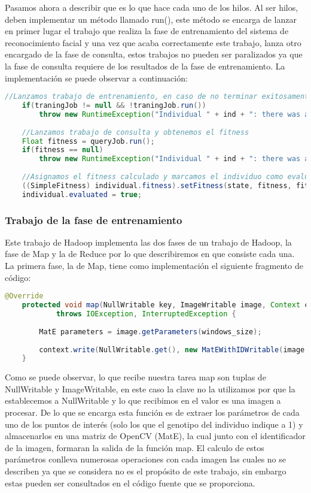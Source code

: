 Pasamos ahora a describir que es lo que hace cada uno de los hilos. Al ser hilos, deben implementar un m\'etodo llamado run(), este método se encarga de lanzar en primer lugar el trabajo que realiza la fase de entrenamiento del sistema de reconocimiento facial y una vez que acaba correctamente este trabajo, lanza otro encargado de la fase de consulta, estos trabajos no pueden ser paralizados ya que la fase de consulta requiere de los resultados de la fase de entrenamiento. La implementación se puede observar a continuación:

 \begin{lstlisting}[language=Java]
 	//Lanzamos trabajo de entrenamiento, en caso de no terminar exitosamente lanzamos una excepcion
	if(traningJob != null && !traningJob.run())
		throw new RuntimeException("Individual " + ind + ": there was a problem during the training phase");
		
	//Lanzamos trabajo de consulta y obtenemos el fitness
	Float fitness = queryJob.run();
	if(fitness == null)
		throw new RuntimeException("Individual " + ind + ": there was a problem during the query phase");
			
	//Asignamos el fitness calculado y marcamos el individuo como evaluado
	((SimpleFitness) individual.fitness).setFitness(state, fitness, fitness >= 1F);
	individual.evaluated = true;	
\end{lstlisting}

\subsubsection{Trabajo de la fase de entrenamiento}

Este trabajo de Hadoop implementa las dos fases de un trabajo de Hadoop, la fase de Map y la de Reduce por lo que describiremos en que consiste cada una. La primera fase, la de Map, tiene como implementación el siguiente fragmento de c\'odigo:

 \begin{lstlisting}[language=Java]
	@Override
	protected void map(NullWritable key, ImageWritable image, Context context)
			throws IOException, InterruptedException {
		
		MatE parameters = image.getParameters(windows_size);
		
		context.write(NullWritable.get(), new MatEWithIDWritable(image.getId(), parameters));
	}
\end{lstlisting}

Como se puede observar, lo que recibe nuestra tarea map son tuplas de NullWritable y ImageWritable, en este caso la clave no la utilizamos por que la establecemos a NullWritable y lo que recibimos en el valor es una imagen a procesar. De lo que se encarga esta función es de extraer los parámetros de cada uno de los puntos de interés (solo los que el genotipo del individuo indique a 1) y almacenarlos en una matriz de OpenCV (MatE), la cual junto con el identificador de la imagen, formaran la salida de la función map. El calculo de estos parámetros conlleva numerosas operaciones con cada imagen las cuales no se describen ya que se considera no es el propósito de este trabajo, sin embargo estas pueden ser consultados en el código fuente que se proporciona.


